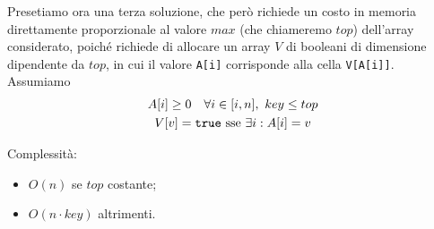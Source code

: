 Presetiamo ora una terza soluzione, che però richiede un costo in memoria direttamente proporzionale al valore $max$ (che chiameremo $top$)
dell'array considerato, poiché richiede di allocare un array $V$ di booleani di dimensione dipendente da $top$, in cui il valore \texttt{A[i]} corrisponde alla cella \texttt{V[A[i]]}. Assumiamo
\begin{gather*}
	A[i] \geq 0 \quad \forall i \in [i,n], \ key \leq top \\
	V[v] = \text{\texttt{true} sse } \exists i : A[i] = v 
\end{gather*}


Complessità:
\begin{itemize}
	\item $O(n)$ se $top$ costante;
	\item $O(n \cdot key)$ altrimenti.
\end{itemize}
